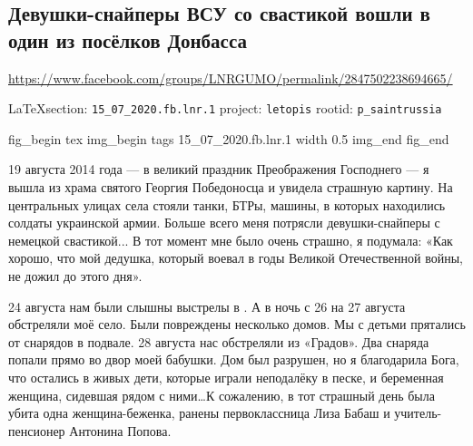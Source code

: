  
 
  
\subsection{Девушки-снайперы ВСУ со свастикой вошли в один из посёлков Донбасса}
\url{https://www.facebook.com/groups/LNRGUMO/permalink/2847502238694665/}
\label{sec:15_07_2020.fb.lnr.1}

\cite{15_07_2020.fb.lnr.1}

\vspace{0.5cm}
{\ifDEBUG\small\LaTeX section: \verb|15_07_2020.fb.lnr.1| project: \verb|letopis| rootid: \verb|p_saintrussia|\fi}
\vspace{0.5cm}

\ifcmt
fig_begin 
	tex \centering
  img_begin 
    tags 15_07_2020.fb.lnr.1
    width 0.5
  img_end
fig_end
\fi



19 августа 2014 года --- в великий праздник Преображения Господнего --- я вышла из
храма святого Георгия Победоносца и увидела страшную картину. На центральных
улицах села стояли танки, БТРы, машины, в которых находились солдаты украинской
армии. Больше всего меня потрясли девушки-снайперы с немецкой свастикой... В
тот момент мне было очень страшно, я подумала: «Как хорошо, что мой дедушка,
который воевал в годы Великой Отечественной войны, не дожил до этого дня».

24 августа нам были слышны выстрелы в . А в ночь с 26 на 27
августа обстреляли моё село. Были повреждены несколько домов. Мы с детьми
прятались от снарядов в подвале. 28 августа нас обстреляли из «Градов». Два
снаряда попали прямо во двор моей бабушки. Дом был разрушен, но я благодарила
Бога, что остались в живых дети, которые играли неподалёку в песке, и
беременная женщина, сидевшая рядом с ними\ldots К сожалению, в тот страшный день
была убита одна женщина-беженка, ранены первоклассница Лиза Бабаш и
учитель-пенсионер Антонина Попова.


